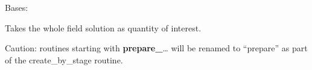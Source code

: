 \documentclass[letterpaper,10pt,english]{sphinxmanual}
\begin{document}
\begin{fulllineitems}
\label{\detokenize{solver:solver.flexi.FieldSolution}}
Bases: 

Takes the whole field solution as quantity of interest.

Caution: routines starting with {\color{red}\bfseries{}prepare\_}… 
will be renamed to “prepare” as part of the create\_by\_stage
routine.

\begin{fulllineitems}
\label{\detokenize{solver:solver.flexi.FieldSolution.prepare_iteration_postproc}}
\end{fulllineitems}


\begin{fulllineitems}
\label{\detokenize{solver:solver.flexi.FieldSolution.prepare_simulation_postproc}}
\end{fulllineitems}


\end{fulllineitems}

\end{document}
